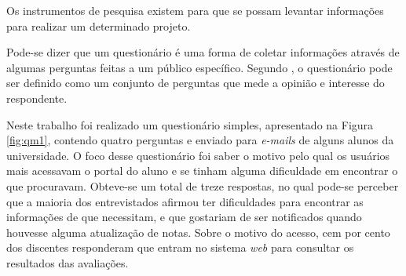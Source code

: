 
	\par Os instrumentos de pesquisa existem para que se possam levantar
informações para realizar um determinado projeto.

	\par Pode-se dizer que um questionário é uma forma de coletar
informações através de algumas perguntas feitas a um público específico.
Segundo , o questionário pode ser definido como
um conjunto de perguntas que mede a opinião e interesse do respondente.

	\par Neste trabalho foi realizado um questionário simples, apresentado na
Figura \ref{fig:qm1}, contendo quatro perguntas e enviado para \textit{e-mails}
de alguns alunos da universidade. O foco desse questionário foi saber o motivo
pelo qual os usuários mais acessavam o portal do aluno e se tinham alguma
dificuldade em encontrar o que procuravam. Obteve-se um total de treze
respostas, no qual pode-se perceber que a maioria dos entrevistados afirmou
ter dificuldades para encontrar as informações de que necessitam, e que
gostariam de ser notificados quando houvesse alguma atualização de notas. Sobre
o motivo do acesso, cem por cento dos discentes responderam que entram no
sistema \textit{web} para consultar os resultados das avaliações.


